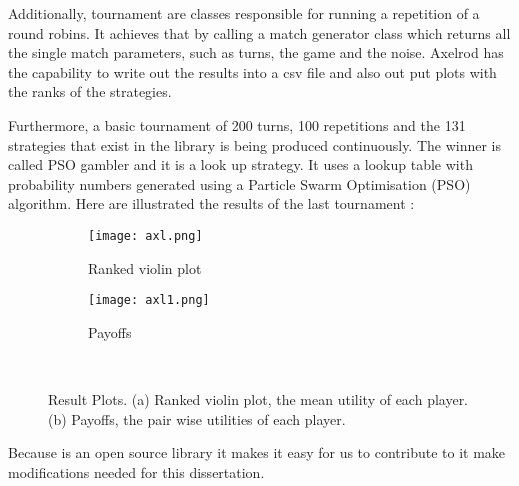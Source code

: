 Additionally, tournament are classes responsible for running a repetition of a
round robins. It achieves that by calling a match generator class which
returns all the single match parameters, such as turns, the game and the noise.
Axelrod has the capability to write out the results into a csv file and also out
put plots with the ranks of the strategies.

Furthermore, a basic tournament of 200 turns, 100 repetitions and the 131 strategies
that exist in the library is being produced continuously. The winner is called
PSO gambler and it is a look up strategy. It uses a lookup table with probability
numbers generated using a Particle Swarm Optimisation (PSO) algorithm.
Here are illustrated the results of the last tournament :

\begin{figure}[h]
\centering
    \begin{subfigure}[t]{0.55\textwidth}
    \centering
        \texttt{[image: axl.png]}
    \caption{Ranked violin plot}
    \end{subfigure}
\hfill
    \begin{subfigure}[t]{0.50\textwidth}\centering
    \centering
        \texttt{[image: axl1.png]}
    \caption{Payoffs}
    \end{subfigure}
~
\caption{Result Plots. (a) Ranked violin plot, the mean utility of each player.
(b) Payoffs, the pair wise utilities of each player.}
\label{fig:axelrodplots}
\end{figure}

Because is an open source library it makes it easy for us to contribute to it
make modifications needed for this dissertation.


